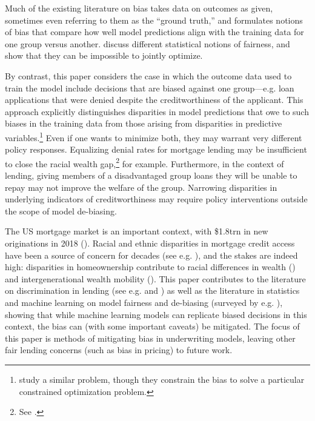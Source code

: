 Much of the existing literature on bias takes data on outcomes as given, sometimes even referring to them as the ``ground truth,'' and formulates notions of bias that compare how well model predictions align with the training data for one group versus another.  discuss different statistical notions of fairness, and show that they can be impossible to jointly optimize.

By contrast, this paper considers the case in which the outcome data used to train the model include decisions that are biased against one group---e.g. loan applications that were denied despite the creditworthiness of the applicant. This approach explicitly distinguishes disparities in model predictions that owe to such biases in the training data from those arising from disparities in predictive variables.\footnote{ study a similar problem, though they constrain the bias to solve a particular constrained optimization problem.} Even if one wants to minimize both, they may warrant very different policy responses. Equalizing denial rates for mortgage lending may be insufficient to close the racial wealth gap,\footnote{See .} for example. Furthermore, in the context of lending, giving members of a disadvantaged group loans they will be unable to repay may not improve the welfare of the group. Narrowing disparities in underlying indicators of creditworthiness may require policy interventions outside the scope of model de-biasing.

The US mortgage market is an important context, with \$1.8trn in new originations in 2018 (). Racial and ethnic disparities in mortgage credit access have been a source of concern for decades (see e.g.	), and the stakes are indeed high: disparities in homeownership contribute to racial differences in wealth () and intergenerational wealth mobility (). This paper contributes to the literature on discrimination in lending (see e.g.  and ) as well as the literature in statistics and machine learning on model fairness and de-biasing (surveyed by e.g. ), showing that while machine learning models can replicate biased decisions in this context, the bias can (with some important caveats) be mitigated. The focus of this paper is methods of mitigating bias in underwriting models, leaving other fair lending concerns (such as bias  in pricing) to future work.

